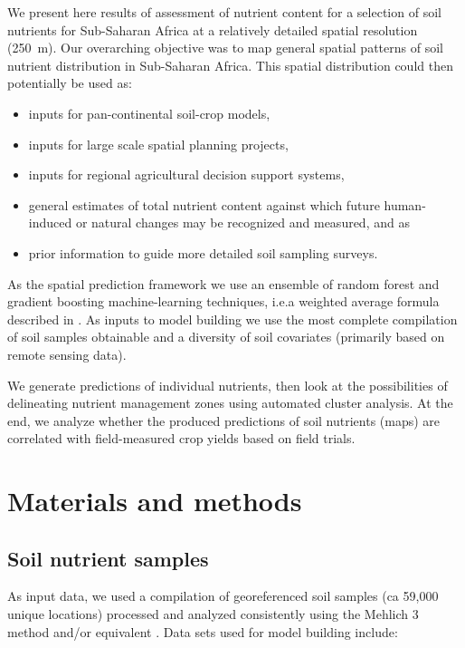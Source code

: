 \begin{linenumbers}
We present here results of assessment of nutrient content for a selection of soil nutrients for Sub-Saharan Africa at a relatively detailed spatial resolution (\SI{250}{\metre}). Our overarching objective was to map general spatial patterns of soil nutrient distribution in Sub-Saharan Africa. This spatial distribution could then potentially be used as: 

\begin{itemize}
\item inputs for pan-continental soil-crop models,
\item inputs for large scale spatial planning projects,
\item inputs for regional agricultural decision support systems,
\item general estimates of total nutrient content against which future human-induced or natural changes may be recognized and measured, and as
\item prior information to guide more detailed soil sampling surveys.
\end{itemize}

As the spatial prediction framework we use an ensemble of random forest \citep{Wright2016} and gradient boosting \citep{2016arXiv160302754C} machine-learning techniques, i.e.\@ a weighted average formula described in \citet{krogh1996learning}. As inputs to model building we use the most complete compilation of soil samples obtainable and a diversity of soil covariates (primarily based on remote sensing data).\par 

We generate predictions of individual nutrients, then look at the possibilities of delineating nutrient management zones using automated cluster analysis. At the end, we analyze whether the produced predictions of soil nutrients (maps) are correlated with field-measured crop yields based on field trials.\par

\clearpage

\section{Materials and methods}\label{sec:1}

\subsection{Soil nutrient samples}\label{sec:samples}

As input data, we used a compilation of georeferenced soil samples (ca 59,000 unique locations) processed and analyzed consistently using the Mehlich 3 method and/or equivalent \citep{eckert1996integrating,roy2006plant}. Data sets used for model building include:


\end{linenumbers}
